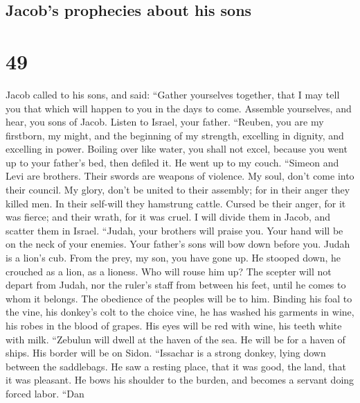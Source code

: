 \hypertarget{jacobs-prophecies-about-his-sons}{%
\subsection{Jacob's prophecies about his
sons}\label{jacobs-prophecies-about-his-sons}}

\hypertarget{section-48}{%
\section{49}\label{section-48}}

 Jacob called to his sons, and said: ``Gather yourselves
together, that I may tell you that which will happen to you in the days
to come.  Assemble yourselves, and hear, you sons of
Jacob. Listen to Israel, your father.  ``Reuben, you are
my firstborn, my might, and the beginning of my strength, excelling in
dignity, and excelling in power.  Boiling over like water,
you shall not excel, because you went up to your father's bed, then
defiled it. He went up to my couch.  ``Simeon and Levi are
brothers. Their swords are weapons of violence.  My soul,
don't come into their council. My glory, don't be united to their
assembly; for in their anger they killed men. In their self-will they
hamstrung cattle.  Cursed be their anger, for it was
fierce; and their wrath, for it was cruel. I will divide them in Jacob,
and scatter them in Israel.  ``Judah, your brothers will
praise you. Your hand will be on the neck of your enemies. Your father's
sons will bow down before you.  Judah is a lion's cub.
From the prey, my son, you have gone up. He stooped down, he crouched as
a lion, as a lioness. Who will rouse him up?  The scepter
will not depart from Judah, nor the ruler's staff from between his feet,
until he comes to whom it belongs. The obedience of the peoples will be
to him.  Binding his foal to the vine, his donkey's colt
to the choice vine, he has washed his garments in wine, his robes in the
blood of grapes.  His eyes will be red with wine, his
teeth white with milk.  ``Zebulun will dwell at the haven
of the sea. He will be for a haven of ships. His border will be on
Sidon.  ``Issachar is a strong donkey, lying down between
the saddlebags.  He saw a resting place, that it was
good, the land, that it was pleasant. He bows his shoulder to the
burden, and becomes a servant doing forced labor.  ``Dan
